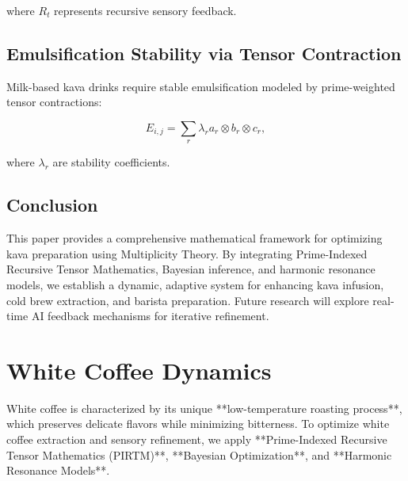 \documentclass{article}
\theoremstyle{plain}
\theoremstyle{claimstyle}
\begin{document}
where \( R_t \) represents recursive sensory feedback.

\subsection{Emulsification Stability via Tensor Contraction}
Milk-based kava drinks require stable emulsification modeled by prime-weighted tensor contractions:

\begin{equation}
    E_{i,j} = \sum_{r} \lambda_r a_r \otimes b_r \otimes c_r,
\end{equation}

where \( \lambda_r \) are stability coefficients.

\subsection{Conclusion}
This paper provides a comprehensive mathematical framework for optimizing kava preparation using Multiplicity Theory. By integrating Prime-Indexed Recursive Tensor Mathematics, Bayesian inference, and harmonic resonance models, we establish a dynamic, adaptive system for enhancing kava infusion, cold brew extraction, and barista preparation. Future research will explore real-time AI feedback mechanisms for iterative refinement.


\section{White Coffee Dynamics}

White coffee is characterized by its unique **low-temperature roasting process**, which preserves delicate flavors while minimizing bitterness. To optimize white coffee extraction and sensory refinement, we apply **Prime-Indexed Recursive Tensor Mathematics (PIRTM)**, **Bayesian Optimization**, and **Harmonic Resonance Models**.
\end{document}
